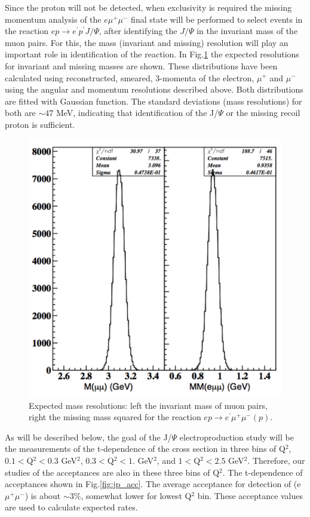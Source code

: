 Since the proton will not be detected, when exclusivity is required the missing momentum analysis  of the $e\mu^+\mu^-$ final state will be performed to select events in the reaction $ep\to e^\prime p^\prime J/\Psi$, after identifying the $J/\Psi$ in the invariant mass of the muon pairs. For this, the mass (invariant and missing) resolution  will play an important role in identification of the reaction.  In Fig.\ref{fig:jp_mres} the expected resolutions for invariant and missing masses are shown. These distributions have been calculated using reconstructed, smeared, 3-momenta of the electron, $\mu^+$ and $\mu^-$ using the angular and momentum resolutions described above. Both distributions are fitted with Gaussian function. The standard deviations (mass resolutions) for both are $\sim 47$ MeV, indicating that identification of the J/$\Psi$ or the missing recoil proton is sufficient. 

\begin{figure}[htbp]
\begin{center}
\includegraphics[width=.5\textwidth]{jpsi_minv_mmis_resolutions.pdf}
\caption{Expected mass resolutions: left the invariant mass of muon pairs, right the missing mass squared for the reaction $ep\to e^\prime \mu^+ \mu^- (p)$.}
\label{fig:jp_mres}
\end{center}
\end{figure}

As will be described below, the goal of the J/$\Psi$ electroproduction study will be the measurements of the t-dependence of the cross section in three bins of Q$^2$, $0.1<$Q$^2 <0.3$ GeV$^2$, $0.3<$Q$^2 <1.$ GeV$^2$, and $1<$Q$^2 < 2.5$ GeV$^2$. Therefore, our studies of the acceptances are also in these three bins of Q$^2$. The t-dependence of acceptances shown in Fig.\ref{fig:jp_acc}. The average acceptance for detection of (e$\mu^+\mu^-$) is about $\sim 3\%$, somewhat lower for lowest Q$^2$ bin. These acceptance values are used to calculate expected  rates. 

